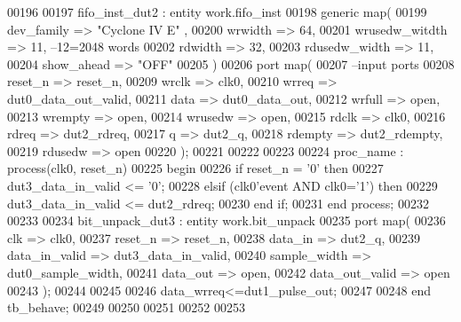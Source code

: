 \begin{DoxyCode}
00196 
00197 fifo\_inst\_dut2 : \textcolor{keywordflow}{entity} work.fifo_inst
00198   \textcolor{keywordflow}{generic} \textcolor{keywordflow}{map}(
00199          dev_family     => \textcolor{keyword}{"Cyclone IV E"}  ,
00200          wrwidth         => \textcolor{vhdllogic}{64},
00201          wrusedw_witdth  => \textcolor{vhdllogic}{11},\textcolor{keyword}{ --12=2048 words }
00202          rdwidth         => \textcolor{vhdllogic}{32},
00203          rdusedw_width   => \textcolor{vhdllogic}{11},
00204          show_ahead      => \textcolor{keyword}{"OFF"}
00205   \textcolor{vhdlchar}{)} 
00206   \textcolor{keywordflow}{port} \textcolor{keywordflow}{map}(
00207 \textcolor{keyword}{      --input ports }
00208       reset_n       => reset_n,
00209       wrclk         => clk0,
00210       wrreq         => dut0_data_out_valid,
00211       data          => dut0_data_out,
00212       wrfull        => \textcolor{keywordflow}{open},
00213         wrempty       => \textcolor{keywordflow}{open},
00214       wrusedw       => \textcolor{keywordflow}{open},
00215       rdclk          => clk0,
00216       rdreq         => dut2_rdreq,
00217       q             => dut2_q,
00218       rdempty       => dut2_rdempty,
00219       rdusedw       => \textcolor{keywordflow}{open}          
00220         \textcolor{vhdlchar}{)};
00221         
00222         
00223         
00224 proc\_name : \textcolor{keywordflow}{process}(clk0, reset_n)
00225 \textcolor{vhdlkeyword}{begin}
00226    \textcolor{keywordflow}{if} \textcolor{vhdlchar}{reset_n} \textcolor{vhdlchar}{=} \textcolor{vhdlchar}{'}\textcolor{vhdllogic}{}\textcolor{vhdllogic}{0}\textcolor{vhdlchar}{'} \textcolor{keywordflow}{then} 
00227       \textcolor{vhdlchar}{dut3_data_in_valid} \textcolor{vhdlchar}{<=} \textcolor{vhdlchar}{'}\textcolor{vhdllogic}{}\textcolor{vhdllogic}{0}\textcolor{vhdlchar}{'};
00228    \textcolor{keywordflow}{elsif} \textcolor{vhdlchar}{(}\textcolor{vhdlchar}{clk0}\textcolor{vhdlchar}{'}\textcolor{vhdlkeyword}{event} \textcolor{keywordflow}{AND} \textcolor{vhdlchar}{clk0}\textcolor{vhdlchar}{=}\textcolor{vhdlchar}{'}\textcolor{vhdllogic}{}\textcolor{vhdllogic}{1}\textcolor{vhdlchar}{'}\textcolor{vhdlchar}{)} \textcolor{keywordflow}{then} 
00229       \textcolor{vhdlchar}{dut3_data_in_valid} \textcolor{vhdlchar}{<=} \textcolor{vhdlchar}{dut2_rdreq};
00230    \textcolor{keywordflow}{end} \textcolor{keywordflow}{if};
00231 \textcolor{keywordflow}{end} \textcolor{keywordflow}{process};
00232         
00233                
00234   bit\_unpack\_dut3 : \textcolor{keywordflow}{entity} work.bit_unpack 
00235 \textcolor{keywordflow}{port} \textcolor{keywordflow}{map}(
00236         clk             => clk0,
00237         reset_n         => reset_n,
00238         data_in         => dut2_q,
00239         data_in_valid   => dut3_data_in_valid,
00240         sample_width    => dut0_sample_width,
00241         data_out        => \textcolor{keywordflow}{open},
00242         data_out_valid  => \textcolor{keywordflow}{open}
00243 \textcolor{vhdlchar}{)};
00244 
00245 
00246 \textcolor{vhdlchar}{data_wrreq}\textcolor{vhdlchar}{<=}\textcolor{vhdlchar}{dut1_pulse_out};
00247 
00248     \textcolor{keywordflow}{end} \textcolor{vhdlchar}{tb\_behave};
00249   
00250   
00251 
00252 
00253   
\end{DoxyCode}
